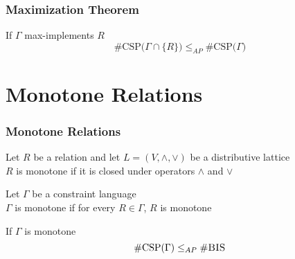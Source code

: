 \documentclass[a4paper,handout]{beamer}
\newcommand{\ccsp}{\#CSP}
\newcommand{\cbis}{\#\textsc{BIS}}
\newcommand{\aple}{\le_{AP}}
\theoremstyle{definition}
\begin{document}
\begin{frame}
\frametitle{Maximization Theorem}
\begin{theorem}
If \(\Gamma\) max-implements \(R\)
\[\mathrm{\#CSP(}\Gamma \cap \{R\}\mathrm{)} \aple \mathrm{\#CSP(}\Gamma\mathrm{)}\]
\end{theorem}
\end{frame}

\section{Monotone Relations}

\begin{frame}
\frametitle{Monotone Relations}
\begin{definition}
Let \(R\) be a relation and let \(L=(V, \wedge, \vee)\) be a distributive lattice\\
\(R\) is monotone if it is closed under operators \(\wedge\) and \(\vee\) 
\end{definition}

\begin{definition}
Let \(\Gamma\) be a constraint language\\
\(\Gamma\) is monotone if for every \(R\in \Gamma\), \(R\) is monotone
\end{definition}

\begin{theorem}
If \(\Gamma\) is monotone
\[\mathrm{\ccsp(}\Gamma\mathrm{)}\aple\mathrm{\cbis}\]
\end{theorem}
\end{frame}
\end{document}

